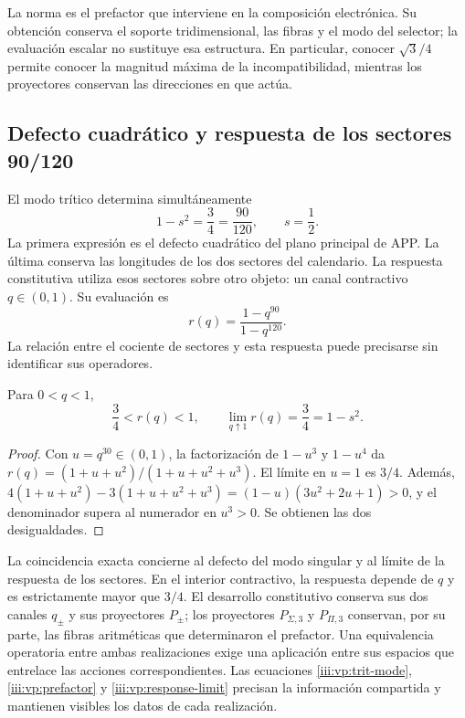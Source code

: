 La norma es el prefactor que interviene en la composición electrónica.
Su obtención conserva el soporte tridimensional, las fibras y el modo
del selector; la evaluación escalar no sustituye esa estructura. En
particular, conocer $\sqrt3/4$ permite conocer la magnitud máxima de
la incompatibilidad, mientras los proyectores conservan las direcciones
en que actúa.

\clearpage
\subsection{Defecto cuadrático y respuesta de los sectores 90/120}

El modo trítico determina simultáneamente
\begin{equation}
 1-s^2=\frac34=\frac{90}{120},\qquad s=\frac12.
 \label{iii:vp:defect-ratio}
\end{equation}
La primera expresión es el defecto cuadrático del plano principal de APP.
La última conserva las longitudes de los dos sectores del calendario.
La respuesta constitutiva utiliza esos sectores sobre otro objeto: un
canal contractivo $q\in(0,1)$. Su evaluación es
\[
 r(q)=\frac{1-q^{90}}{1-q^{120}}.
\]
La relación entre el cociente de sectores y esta respuesta puede
precisarse sin identificar sus operadores.

\begin{proposition}
Para $0<q<1$,
\begin{equation}
 \frac34<r(q)<1,\qquad
 \lim_{q\uparrow1}r(q)=\frac34=1-s^2.
 \label{iii:vp:response-limit}
\end{equation}
\end{proposition}
\begin{proof}
Con $u=q^{30}\in(0,1)$, la factorización de $1-u^3$ y
$1-u^4$ da
$r(q)=(1+u+u^2)/(1+u+u^2+u^3)$. El límite en $u=1$ es
$3/4$. Además,
$4(1+u+u^2)-3(1+u+u^2+u^3)
=(1-u)(3u^2+2u+1)>0$, y el denominador supera al numerador
en $u^3>0$. Se obtienen las dos desigualdades.
\end{proof}

La coincidencia exacta concierne al defecto del modo singular y al límite
de la respuesta de los sectores. En el interior contractivo, la respuesta
depende de $q$ y es estrictamente mayor que $3/4$. El desarrollo
constitutivo conserva sus dos canales $q_\pm$ y sus proyectores
$P_\pm$; los proyectores $P_{\Sigma,3}$ y $P_{\Pi,3}$ conservan,
por su parte, las fibras aritméticas que determinaron el prefactor.
Una equivalencia operatoria entre ambas realizaciones exige una aplicación
entre sus espacios que entrelace las acciones correspondientes.
Las ecuaciones \eqref{iii:vp:trit-mode}, \eqref{iii:vp:prefactor} y
\eqref{iii:vp:response-limit} precisan la información compartida y
mantienen visibles los datos de cada realización.
